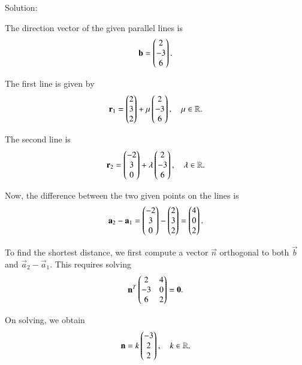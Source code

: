 \documentclass{beamer}
\begin{document}
\begin{frame}{Solution:}



The direction vector of the given parallel lines is
\begin{align}
    \mathbf{b} = \begin{pmatrix}2 \\ -3 \\ 6\end{pmatrix}.
\end{align}

The first line is given by
\begin{align}
    \mathbf{r}_1 = \begin{pmatrix}2 \\ 3 \\ 2\end{pmatrix} + \mu \begin{pmatrix}2 \\ -3 \\ 6\end{pmatrix}, \quad \mu \in \mathbb{R}.
\end{align}

The second line is
\begin{align}
    \mathbf{r}_2 = \begin{pmatrix}-2 \\ 3 \\ 0\end{pmatrix} + \lambda \begin{pmatrix}2 \\ -3 \\ 6\end{pmatrix}, \quad \lambda \in \mathbb{R}.
\end{align}
\end{frame}
\begin{frame}
Now, the difference between the two given points on the lines is
\begin{align}
    \mathbf{a}_2 - \mathbf{a}_1 
    = \begin{pmatrix}-2 \\ 3 \\ 0\end{pmatrix} - \begin{pmatrix}2 \\ 3 \\ 2\end{pmatrix} 
    = \begin{pmatrix}4 \\ 0 \\ 2\end{pmatrix}.
\end{align}

To find the shortest distance, we first compute a vector $\vec{n}$ orthogonal to both $\vec{b}$ and $\vec{a}_2 - \vec{a}_1$.  
This requires solving
\begin{align}
    \mathbf{n}^T 
    \begin{pmatrix}
        2 & 4 \\
       -3 & 0 \\
        6 & 2
    \end{pmatrix} = \mathbf{0}.
\end{align}

On solving, we obtain
\begin{align}
    \mathbf{n} = k \begin{pmatrix}-3 \\ 2 \\ 2\end{pmatrix}, \quad k \in \mathbb{R}.
\end{align}
\end{frame}
\end{document}
